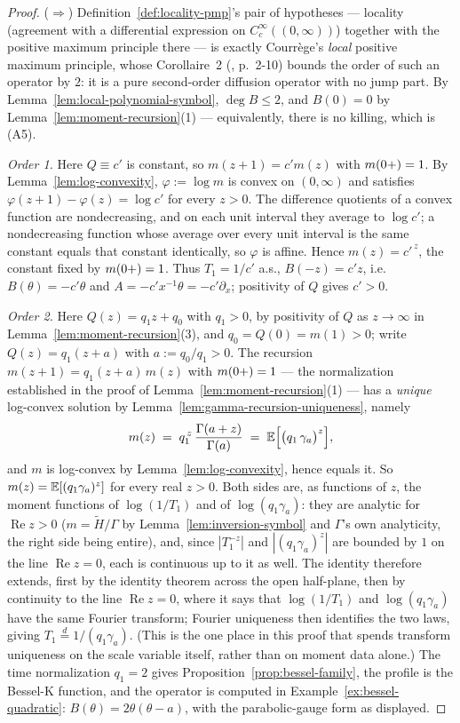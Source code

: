 \begin{proof}
($\Rightarrow$) Definition~\ref{def:locality-pmp}'s pair of hypotheses --- locality
(agreement with a differential expression on $C_c^\infty((0,\infty))$) together with the
positive maximum principle there --- is exactly Courrège's \emph{local} positive maximum
principle, whose Corollaire~2 (, p.~2-10) bounds the order of such an
operator by $2$: it is a pure second-order diffusion operator with no jump part. By
Lemma~\ref{lem:local-polynomial-symbol}, $\deg B \le 2$, and $B(0) = 0$ by
Lemma~\ref{lem:moment-recursion}(1) --- equivalently, there is no killing, which is (A5).

\emph{Order 1.} Here $Q \equiv c'$ is constant, so $m(z+1) = c'm(z)$ with $m(0{+})=1$. By
Lemma~\ref{lem:log-convexity}, $\varphi := \log m$ is convex on $(0,\infty)$ and satisfies
$\varphi(z+1) - \varphi(z) = \log c'$ for every $z > 0$. The difference quotients of a convex
function are nondecreasing, and on each unit interval they average to $\log c'$; a
nondecreasing function whose average over every unit interval is the same constant equals that
constant identically, so $\varphi$ is affine. Hence $m(z) = c'^{\,z}$, the constant fixed by
$m(0{+}) = 1$. Thus $T_1 = 1/c'$ a.s., $B(-z) = c'z$, i.e.\ $B(\theta) = -c'\theta$ and
$A = -c'x^{-1}\theta = -c'\partial_x$; positivity of $Q$ gives $c' > 0$.

\emph{Order 2.} Here $Q(z) = q_1 z + q_0$ with $q_1 > 0$, by positivity of $Q$ as
$z \to \infty$ in Lemma~\ref{lem:moment-recursion}(3), and $q_0 = Q(0) = m(1) > 0$; write
$Q(z) = q_1(z + a)$ with $a := q_0/q_1 > 0$. The recursion $m(z+1) = q_1(z+a)\,m(z)$ with
$m(0{+}) = 1$ --- the normalization established in the proof of
Lemma~\ref{lem:moment-recursion}(1) --- has a \emph{unique} log-convex solution by
Lemma~\ref{lem:gamma-recursion-uniqueness}, namely
\[
  m(z) \;=\; q_1^{\,z}\,\frac{\Gamma(a + z)}{\Gamma(a)}
  \;=\; \mathbb{E}\Bigl[\bigl(q_1\,\gamma_a\bigr)^{z}\Bigr],
\]
and $m$ is log-convex by Lemma~\ref{lem:log-convexity}, hence equals it. So
$m(z) = \mathbb{E}[(q_1\gamma_a)^z]$ for every real $z > 0$. Both sides are, as functions of $z$, the
moment functions of $\log(1/T_1)$ and of $\log(q_1\gamma_a)$: they are analytic for
$\operatorname{Re} z > 0$ ($m = \tilde H/\Gamma$ by Lemma~\ref{lem:inversion-symbol} and
$\Gamma$'s own analyticity, the right side being entire), and, since $|T_1^{-z}|$ and
$|(q_1\gamma_a)^z|$ are bounded by $1$ on the line $\operatorname{Re} z = 0$, each is
continuous up to it as well. The identity therefore extends, first by the identity theorem
across the open half-plane, then by continuity to the line $\operatorname{Re} z = 0$, where it
says that $\log(1/T_1)$ and $\log(q_1\gamma_a)$ have the same Fourier transform; Fourier
uniqueness then identifies the two laws, giving $T_1 \stackrel{d}{=} 1/(q_1\gamma_a)$. (This is
the one place in this proof that spends transform uniqueness on the scale variable itself,
rather than on moment data alone.) The time normalization $q_1 = 2$ gives
Proposition~\ref{prop:bessel-family}, the profile is the Bessel-K function, and the operator
is computed in Example~\ref{ex:bessel-quadratic}: $B(\theta) = 2\theta(\theta - a)$, with the
parabolic-gauge form as displayed.


\end{proof}
